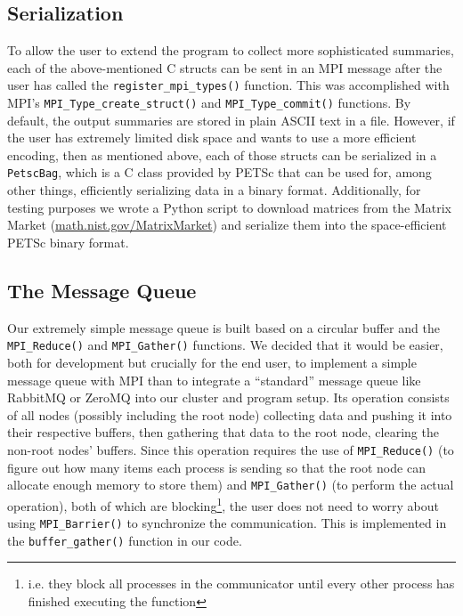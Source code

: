 \documentclass[11pt]{article}
\begin{document}
\subsection*{Serialization}
To allow the user to extend the program to collect more sophisticated summaries, each of the above-mentioned C structs can be sent in an MPI message after the user has called the \lstinline{register_mpi_types()} function. This was accomplished with MPI's \lstinline{MPI_Type_create_struct()} and \lstinline{MPI_Type_commit()} functions. By default, the output summaries are stored in plain ASCII text in a file. However, if the user has extremely limited disk space and wants to use a more efficient encoding, then as mentioned above, each of those structs can be serialized in a \lstinline{PetscBag}, which is a C class provided by PETSc that can be used for, among other things, efficiently serializing data in a binary format. Additionally, for testing purposes we wrote a Python script to download matrices from the Matrix Market (\url{math.nist.gov/MatrixMarket}) and serialize them into the space-efficient PETSc binary format. 
\subsection*{The Message Queue}
Our extremely simple message queue is built based on a circular buffer and the \lstinline{MPI_Reduce()} and \lstinline{MPI_Gather()} functions. We decided that it would be easier, both for development but crucially for the end user, to implement a simple message queue with MPI than to integrate a ``standard'' message queue like RabbitMQ or ZeroMQ into our cluster and program setup. Its operation consists of all nodes (possibly including the root node) collecting data and pushing it into their respective buffers, then gathering that data to the root node, clearing the non-root nodes' buffers. Since this operation requires the use of \lstinline{MPI_Reduce()} (to figure out how many items each process is sending so that the root node can allocate enough memory to store them) and \lstinline{MPI_Gather()} (to perform the actual operation), both of which are blocking\footnote{i.e. they block all processes in the communicator until every other process has finished executing the function}, the user does not need to worry about using \lstinline{MPI_Barrier()} to synchronize the communication. This is implemented in the \lstinline{buffer_gather()} function in our code.
\end{document}
